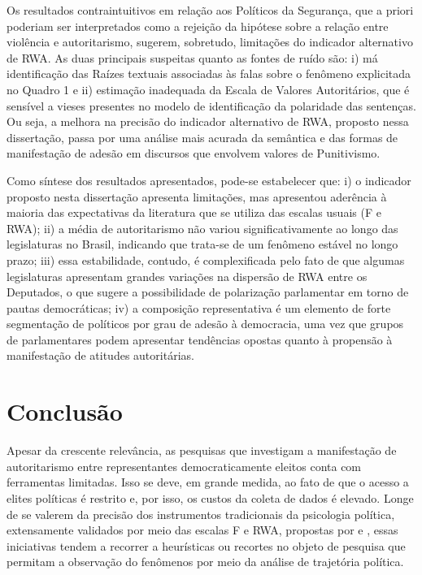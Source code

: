 \documentclass[
12pt,				%
openright,			%
twoside,			%
a4paper,			%
english,			%
french,				%
spanish,			%
brazil				%
]{abntex2}
\begin{document}
Os resultados contraintuitivos em relação aos Políticos da Segurança, que a priori poderiam ser interpretados como a rejeição da hipótese sobre a relação entre violência e autoritarismo, sugerem, sobretudo, limitações do indicador alternativo de RWA. As duas principais suspeitas quanto as fontes de ruído são: i) má identificação das Raízes textuais associadas às falas sobre o fenômeno explicitada no Quadro 1 e ii) estimação inadequada da Escala de Valores Autoritários, que é sensível a vieses presentes no modelo de identificação da polaridade das sentenças. Ou seja, a melhora na precisão do indicador alternativo de RWA, proposto nessa dissertação, passa por uma análise mais acurada da semântica e das formas de manifestação de adesão em discursos que envolvem valores de Punitivismo. 

Como síntese dos resultados apresentados, pode-se estabelecer que: i) o indicador proposto nesta dissertação apresenta limitações, mas apresentou aderência à maioria das expectativas da literatura que se utiliza das escalas usuais (F e RWA); ii) a média de autoritarismo não variou significativamente ao longo das legislaturas no Brasil, indicando que trata-se de um fenômeno estável no longo prazo; iii) essa estabilidade, contudo, é complexificada pelo fato de que algumas legislaturas apresentam grandes variações na dispersão de RWA entre os Deputados, o que sugere a possibilidade de polarização parlamentar em torno de pautas democráticas; iv) a composição representativa é um elemento de forte segmentação de políticos por grau de adesão à democracia, uma vez que grupos de parlamentares podem apresentar tendências opostas quanto à propensão à manifestação de atitudes autoritárias. 

\chapter{Conclusão}

Apesar da crescente relevância, as pesquisas que investigam a manifestação de autoritarismo entre representantes democraticamente eleitos conta com ferramentas limitadas. Isso se deve, em grande medida, ao fato de que o acesso a elites políticas é restrito e, por isso, os custos da coleta de dados é elevado. Longe de se valerem da precisão dos instrumentos tradicionais da psicologia política, extensamente validados por meio das escalas F e RWA, propostas por  e , essas iniciativas tendem a recorrer a heurísticas ou recortes no objeto de pesquisa que permitam a observação do fenômenos por meio da análise de trajetória política.  
\end{document}
